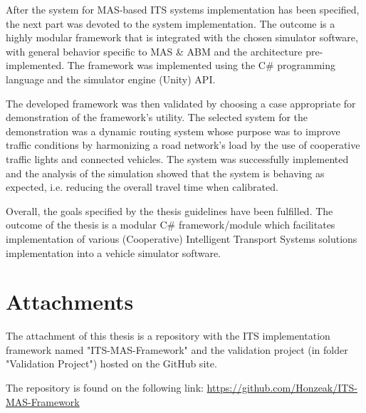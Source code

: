 \documentclass[titlepage, 12pt]{article}
\begin{document}
After the system for MAS-based ITS systems implementation has been specified, the next part was
devoted to the system implementation. The outcome is a highly modular framework that is
integrated with the chosen simulator software, with general behavior specific to MAS \& ABM 
and the architecture pre-implemented. The framework was implemented using the C\# programming 
language and the simulator engine (Unity) API. 

The developed framework was then validated by choosing a case appropriate for demonstration of
the framework's utility. The selected system for the demonstration was a dynamic routing system
whose purpose was to improve traffic conditions by harmonizing a road network's load by the use
of cooperative traffic lights and connected vehicles. The system was successfully implemented
and the analysis of the simulation showed that the system is behaving as expected, i.e.
reducing the overall travel time when calibrated.

Overall, the goals specified by the thesis guidelines have been fulfilled. The outcome of the thesis is a 
modular C\# framework/module which facilitates implementation of various (Cooperative) 
Intelligent Transport Systems solutions implementation into a vehicle simulator software. 

\clearpage

\section{Attachments}

The attachment of this thesis is a repository with the ITS implementation framework named "ITS-MAS-Framework" and 
the validation project (in folder "Validation Project") hosted on the GitHub site.

The repository is found on the following link: \newline \url{https://github.com/Honzeak/ITS-MAS-Framework}


\clearpage

\printbibliography
\end{document}
